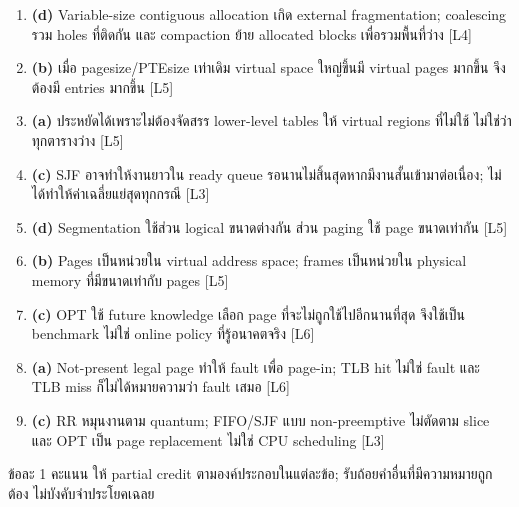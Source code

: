 \begin{enumerate}[leftmargin=1.4em,start=33,itemsep=0.18cm]
\item \textbf{(d)} Variable-size contiguous allocation เกิด external fragmentation; coalescing รวม holes ที่ติดกัน และ compaction ย้าย allocated blocks เพื่อรวมพื้นที่ว่าง {\small [L4]}
\item \textbf{(b)} เมื่อ pagesize/PTEsize เท่าเดิม virtual space ใหญ่ขึ้นมี virtual pages มากขึ้น จึงต้องมี entries มากขึ้น {\small [L5]}
\item \textbf{(a)} ประหยัดได้เพราะไม่ต้องจัดสรร lower-level tables ให้ virtual regions ที่ไม่ใช้ ไม่ใช่ว่าทุกตารางว่าง {\small [L5]}
\item \textbf{(c)} SJF อาจทำให้งานยาวใน ready queue รอนานไม่สิ้นสุดหากมีงานสั้นเข้ามาต่อเนื่อง; ไม่ได้ทำให้ค่าเฉลี่ยแย่สุดทุกกรณี {\small [L3]}
\item \textbf{(d)} Segmentation ใช้ส่วน logical ขนาดต่างกัน ส่วน paging ใช้ page ขนาดเท่ากัน {\small [L5]}
\item \textbf{(b)} Pages เป็นหน่วยใน virtual address space; frames เป็นหน่วยใน physical memory ที่มีขนาดเท่ากับ pages {\small [L5]}
\item \textbf{(c)} OPT ใช้ future knowledge เลือก page ที่จะไม่ถูกใช้ไปอีกนานที่สุด จึงใช้เป็น benchmark ไม่ใช่ online policy ที่รู้อนาคตจริง {\small [L6]}
\item \textbf{(a)} Not-present legal page ทำให้ fault เพื่อ page-in; TLB hit ไม่ใช่ fault และ TLB miss ก็ไม่ได้หมายความว่า fault เสมอ {\small [L6]}
\item \textbf{(c)} RR หมุนงานตาม quantum; FIFO/SJF แบบ non-preemptive ไม่ตัดตาม slice และ OPT เป็น page replacement ไม่ใช่ CPU scheduling {\small [L3]}
\end{enumerate}
\newpage{}
\noindent ข้อละ 1 คะแนน ให้ partial credit ตามองค์ประกอบในแต่ละข้อ; รับถ้อยคำอื่นที่มีความหมายถูกต้อง ไม่บังคับจำประโยคเฉลย\par\smallskip
